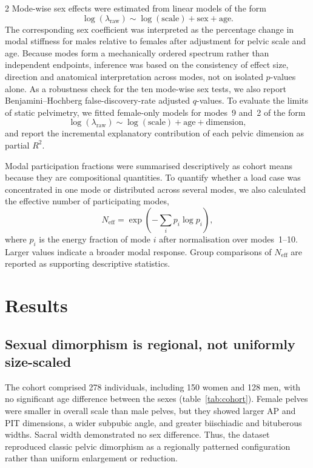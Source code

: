 \documentclass[openacc]{rsproca_new}
\begin{document}
\begin{multicols}{2}
Mode-wise sex effects were estimated from linear models of the form
\begin{equation}
\log(\lambda_{\mathrm{raw}}) \sim \log(\mathrm{scale}) + \mathrm{sex} + \mathrm{age}.
\end{equation}
The corresponding sex coefficient was interpreted as the percentage change in modal stiffness for males relative to females after adjustment for pelvic scale and age. Because modes form a mechanically ordered spectrum rather than independent endpoints, inference was based on the consistency of effect size, direction and anatomical interpretation across modes, not on isolated $p$-values alone. As a robustness check for the ten mode-wise sex tests, we also report Benjamini--Hochberg false-discovery-rate adjusted $q$-values. To evaluate the limits of static pelvimetry, we fitted female-only models for modes~9 and~2 of the form
\begin{equation}
\log(\lambda_{\mathrm{raw}}) \sim \log(\mathrm{scale}) + \mathrm{age} + \mathrm{dimension},
\end{equation}
and report the incremental explanatory contribution of each pelvic dimension as partial $R^2$.

Modal participation fractions were summarised descriptively as cohort means because they are compositional quantities. To quantify whether a load case was concentrated in one mode or distributed across several modes, we also calculated the effective number of participating modes,
\begin{equation}
N_{\mathrm{eff}} = \exp\left(-\sum_i p_i\log p_i\right),
\end{equation}
where $p_i$ is the energy fraction of mode $i$ after normalisation over modes~1--10. Larger values indicate a broader modal response. Group comparisons of $N_{\mathrm{eff}}$ are reported as supporting descriptive statistics.

\section{Results}
\subsection{Sexual dimorphism is regional, not uniformly size-scaled}

The cohort comprised 278 individuals, including 150 women and 128 men, with no significant age difference between the sexes (table~\ref{tab:cohort}). Female pelves were smaller in overall scale than male pelves, but they showed larger AP and PIT dimensions, a wider subpubic angle, and greater biischiadic and bituberous widths. Sacral width demonstrated no sex difference. Thus, the dataset reproduced classic pelvic dimorphism as a regionally patterned configuration rather than uniform enlargement or reduction.


\end{multicols}
\end{document}
